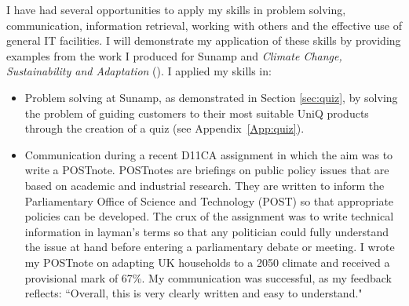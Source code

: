 I have had several opportunities to apply my skills in problem solving, communication, information retrieval, working with others and the effective use of general IT facilities.
I will demonstrate my application of these skills by providing examples from the work I produced for Sunamp and \textit{Climate Change, Sustainability and Adaptation} (\CCSA).
I applied my skills in:
\begin{itemize}
    \item Problem solving at Sunamp, as demonstrated in Section \ref{sec:quiz}, by solving the problem of guiding customers to their most suitable UniQ products through the creation of a quiz (see Appendix~\ref{App:quiz}).
    
    \item Communication during a recent D11CA assignment in which the aim was to write a POSTnote.
    POSTnotes are briefings on public policy issues that are based on academic and industrial research.
    They are written to inform the Parliamentary Office of Science and Technology (POST) so that appropriate policies can be developed.
	The crux of the assignment was to write technical information in layman's terms so that any politician could fully understand the issue at hand before entering a parliamentary debate or meeting.
	I wrote my POSTnote on adapting UK households to a 2050 climate and received a provisional mark of 67\%.
	My communication was successful, as my feedback reflects:
	``Overall, this is very clearly written and easy to understand."
    

\end{itemize}
